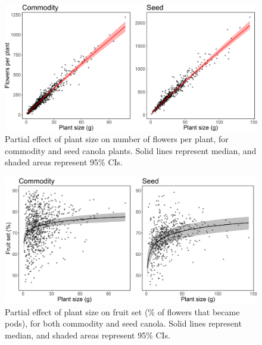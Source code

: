 \documentclass[12pt]{article} %
\begin{document}
\begin{figure} %
    \centering
    \includegraphics[width=\textwidth,keepaspectratio=true]{plSizeflwCount_both.png}
    \caption[Partial effect of plant size on number of flowers per plant]{Partial effect of plant size on number of flowers per plant, for commodity and seed canola plants. Solid lines represent median, and shaded areas represent 95\% CIs.}
    \label{fig:plSizeFlwCount}
\end{figure}

\begin{figure}
    \centering
    \includegraphics[width=\textwidth,keepaspectratio=true]{plSizeFlwSurv_both.png} 
    \caption[Partial effect of plant size on fruit set]{Partial effect of plant size on fruit set (\% of flowers that became pods), for both commodity and seed canola. Solid lines represent median, and shaded areas represent 95\% CIs.}
    \label{fig:flwSurv_both}
\end{figure}
\end{document}
